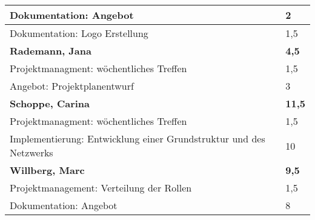 \documentclass[a4paper,11pt]{scrartcl}
\begin{document}
\begin{longtable}{| p{13.8cm} | C{2.4cm} |}
  Dokumentation: Angebot
	&
  2
	\\
	\hline

  Dokumentation: Logo Erstellung
	&
  1,5
	\\
	\hline
	\hline


	\textbf{Rademann, Jana} & \textbf{4,5}\\ %
	\hline

  Projektmanagment: wöchentliches Treffen
	&
  1,5
	\\
	\hline

  Angebot: Projektplanentwurf
	&
  3
	\\
	\hline
	\hline


	\textbf{Schoppe, Carina} & \textbf{11,5}\\ %
	\hline

  Projektmanagment: wöchentliches Treffen
	&
  1,5
	\\
	\hline

  Implementierung: Entwicklung einer Grundstruktur und des Netzwerks
	&
  10
	\\
	\hline
	\hline


	\textbf{Willberg, Marc} & \textbf{9,5}\\ %
	\hline

  Projektmanagement: Verteilung der Rollen
	&
  1,5
	\\
	\hline

  Dokumentation: Angebot
	&
  8
	\\
	\hline

\end{longtable}
\end{document}
